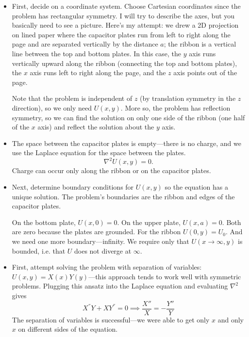 \documentclass[11pt, a4paper]{article}
\renewcommand{\laplacian}{\nabla^{2}}
\begin{document}
\begin{itemize}
	\item First, decide on a coordinate system. Choose Cartesian coordinates since the problem has rectangular symmetry. I will try to describe the axes, but you basically need to see a picture. Here's my attempt: we drew a 2D projection on lined paper where the capacitor plates run from left to right along the page and are separated vertically by the distance $ a $; the ribbon is a vertical line between the top and bottom plates. In this case, the $ y $ axis runs vertically upward along the ribbon (connecting the top and bottom plates), the $ x $ axis runs left to right along the page, and the $ z $ axis points out of the page. 
	
	Note that the problem is independent of $ z $ (by translation symmetry in the $ z $ direction), so we only need $ U(x, y) $. More so, the problem has reflection symmetry, so we can find the solution on only one side of the ribbon (one half of the $ x $ axis) and reflect the solution about the $ y $ axis.
	
	\item The space between the capacitor plates is empty---there is no charge, and we use the Laplace equation for the space between the plates.
	\begin{equation*}
		\laplacian U(x, y) = 0.
	\end{equation*}
	Charge can occur only along the ribbon or on the capacitor plates.
	
	\item Next, determine boundary conditions for $ U(x, y) $ so the equation has a unique solution. The problem's boundaries are the ribbon and edges of the capacitor plates.
	
	On the bottom plate, $ U(x, 0) = 0 $. On the upper plate, $ U(x, a) = 0 $. Both are zero because the plates are grounded. For the ribbon $ U(0, y) = U_{0} $. And we need one more boundary---infinity. We require only that $ U(x \to \infty, y) $ is bounded, i.e. that $ U $ does not diverge at $ \infty $. 
	
	\item First, attempt solving the problem with separation of variables: $ U(x, y) = X(x)Y(y) $---this approach tends to work well with symmetric problems. Plugging this ansatz into the Laplace equation and evaluating $ \laplacian $ gives
	\begin{equation*}
		X^{''}Y + XY^{''} = 0 \implies \frac{X''}{X} = - \frac{Y''}{Y}
	\end{equation*}
	The separation of variables is successful---we were able to get only $ x $ and only $ x $ on different sides of the equation. 
	

\end{itemize}
\end{document}
